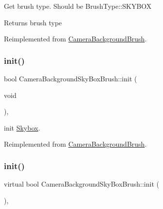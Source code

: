 Get brush type. Should be Brush\+Type\+::\+S\+K\+Y\+B\+OX \begin{DoxyReturn}{Returns}
brush type 
\end{DoxyReturn}


Reimplemented from \hyperlink{classCameraBackgroundBrush_a72447fd86e40e0d7e263b906c2f9af12}{Camera\+Background\+Brush}.

\mbox{\label{classCameraBackgroundSkyBoxBrush_a267d8d2c4f44ac27c6f028b06fb31775}} 
\subsubsection{\texorpdfstring{init()}{init()}\hspace{0.1cm}{\footnotesize\ttfamily [1/2]}}
{\footnotesize\ttfamily bool Camera\+Background\+Sky\+Box\+Brush\+::init (\begin{DoxyParamCaption}\item[{void}]{ }\end{DoxyParamCaption})\hspace{0.3cm}{\ttfamily [override]}, {\ttfamily [virtual]}}

init \hyperlink{classSkybox}{Skybox}. 

Reimplemented from \hyperlink{classCameraBackgroundBrush}{Camera\+Background\+Brush}.

\mbox{\label{classCameraBackgroundSkyBoxBrush_a64ccd3e968b8a907d72b82aaa354b4ca}} 
\subsubsection{\texorpdfstring{init()}{init()}\hspace{0.1cm}{\footnotesize\ttfamily [2/2]}}
{\footnotesize\ttfamily virtual bool Camera\+Background\+Sky\+Box\+Brush\+::init (\begin{DoxyParamCaption}{ }\end{DoxyParamCaption})\hspace{0.3cm}{\ttfamily [override]}, {\ttfamily [virtual]}}

